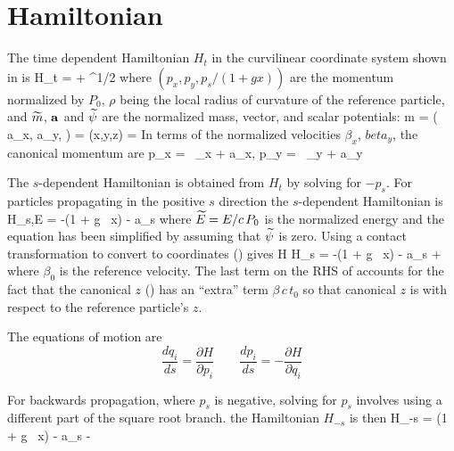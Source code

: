 \section{Hamiltonian}
\label{s:mag.hamiltonian}
The time dependent Hamiltonian $H_t$ in the curvilinear coordinate system shown
in  is
\Begineq
  H_t = \wt\psi + ^{1/2}
\Endeq
where $(p_x, p_y, p_s/(1+gx))$ are the momentum normalized by $P_0$,
$\rho$ being the local radius of curvature of the reference particle,
and $\widetilde m$, ${\bf a}$ and $\widetilde\psi$ are the normalized mass, vector, and scalar
potentials:
\Begineq
  \wt m =  \qquad
  \left( a_x, a_y,  \right) =  \qquad 
  \wt\psi(x,y,z) = 
  \label{mmccp}
\Endeq
In terms of the normalized velocities $\beta_x$, $beta_y$, the canonical momentum are
\Begineq
  p_x =  \, \beta_x + a_x, \qquad 
  p_y =  \, \beta_y + a_y
  \label{pmc2pc}
\Endeq

The $s$-dependent Hamiltonian is obtained from $H_t$ by solving for
$-p_s$. For particles propagating in the positive $s$ direction the
$s$-dependent Hamiltonian is
\Begineq
  H_{s,E} = -(1 + g \, x)  - a_s
  \label{hse1gx1}
\Endeq
where $\widetilde E = E/c\, P_0$ is the normalized energy and the equation 
has been simplified by assuming that $\widetilde\psi$ is zero. Using a contact
transformation to convert to \bmad coordinates () gives
\Begineq
  H \equiv H_s = -(1 + g \, x)  - a_s +
   \, 
  \label{h1gx1}
\Endeq
where $\beta_0$ is the reference velocity. The last term on the RHS of
 accounts for the fact that the \bmad canonical $z$ ()
has an ``extra'' term $\beta \, c \, t_0$ so that \bmad canonical $z$ is with
respect to the reference particle's $z$.

The equations
of motion are
\begin{equation}
  \frac{dq_i}{ds} = \frac{\partial H}{\partial p_i} \qquad
  \frac{dp_i}{ds} = -\frac{\partial H}{\partial q_i}
  \label{rshp}
\end{equation}

For backwards propagation, where $p_s$ is negative, solving for $p_s$ involves using
a different part of the square root branch. the Hamiltonian $H_{-s}$ is then
\Begineq
  H_{-s} = (1 + g \, x)  - a_s - 
   \, 
\Endeq

